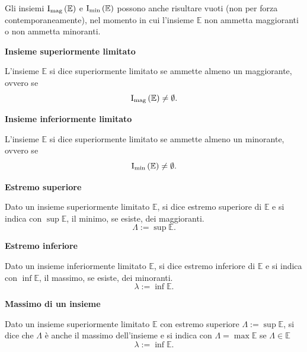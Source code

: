 \begin{observation}
    Gli insiemi $\operatorname{I_{mag}\left(\mathbb{E}\right)}$ e $\operatorname{I_{min}\left(\mathbb{E}\right)}$
    possono anche risultare vuoti (non per forza contemporaneamente),
    nel momento in cui l'insieme $\mathbb{E}$ non ammetta maggioranti o non ammetta minoranti.
\end{observation}


\begin{definition}
    \textbf{Insieme superiormente limitato}
    
    L'insieme $\mathbb{E}$ si dice superiormente limitato se ammette almeno un maggiorante, ovvero se
    \[
        \operatorname{I_{mag}\left(\mathbb{E}\right)} \neq\emptyset.
    \]
\end{definition}

\begin{definition}
    \textbf{Insieme inferiormente limitato}
    
    L'insieme $\mathbb{E}$ si dice superiormente limitato se ammette almeno un minorante, ovvero se
    \[
        \operatorname{I_{min}\left(\mathbb{E}\right)} \neq\emptyset.
    \]
\end{definition}

\begin{definition}
    \textbf{Estremo superiore}
    
    Dato un insieme superiormente limitato $\mathbb{E}$, si dice estremo superiore di $\mathbb{E}$ e
    si indica con $\sup \mathbb{E}$, il minimo, se esiste, dei maggioranti.
    \[
        \Lambda := \sup\mathbb{E}.
    \]
\end{definition}

\begin{definition}
    \textbf{Estremo inferiore}
    
    Dato un insieme inferiormente limitato $\mathbb{E}$, si dice estremo inferiore di $\mathbb{E}$ e
    si indica con $\inf \mathbb{E}$, il massimo, se esiste, dei minoranti.
    \[
        \lambda := \inf\mathbb{E}.
    \]
\end{definition}

\begin{definition}
    \textbf{Massimo di un insieme}
    
    Dato un insieme superiormente limitato $\mathbb{E}$ con estremo superiore $\Lambda := \sup\mathbb{E}$,
    si dice che $\Lambda$ è anche il massimo dell'insieme e si indica con $\Lambda = \max \mathbb{E}$ se
    $\Lambda \in \mathbb{E}$
    \[
        \lambda := \inf\mathbb{E}.
    \]
\end{definition}

